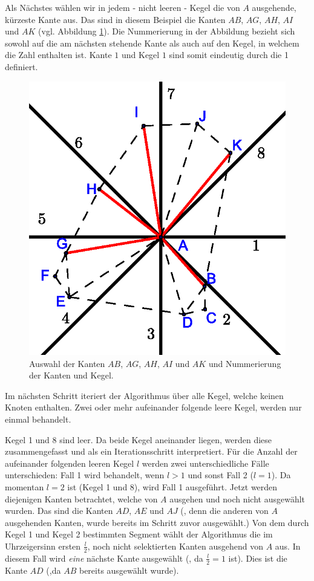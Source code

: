 \documentclass[a4paper,twoside]{IEEEtran}
\begin{document}
Als Nächstes wählen wir in jedem - nicht leeren - Kegel die von $A $ ausgehende, kürzeste Kante aus.
Das sind in diesem Beispiel die Kanten $AB $, $AG $, $AH $, $AI $ und $AK $ (vgl. Abbildung \ref{fig:shortestedge}). 
Die Nummerierung in der Abbildung bezieht sich sowohl auf die am nächsten stehende Kante als auch auf den Kegel, in welchem die Zahl enthalten ist.
Kante $1 $ und Kegel $1 $ sind somit eindeutig durch die 1 definiert.

\begin{figure}[h!]
\centering
\includegraphics[width=0.7\linewidth]{shortest_edge.eps}
\caption{Auswahl der Kanten $AB $, $AG $, $AH $, $AI $ und $AK $ und Nummerierung der Kanten und Kegel.}
\label{fig:shortestedge}
\end{figure}

Im nächsten Schritt iteriert der Algorithmus über alle Kegel, welche keinen Knoten enthalten.
Zwei oder mehr aufeinander folgende leere Kegel, werden nur einmal behandelt.

Kegel 1 und 8 sind leer.
Da beide Kegel aneinander liegen, werden diese zusammengefasst und als ein Iterationsschritt interpretiert.
Für die Anzahl der aufeinander folgenden leeren Kegel $l $ werden zwei unterschiedliche Fälle unterschieden:
Fall 1 wird behandelt, wenn $l>1 $ und sonst Fall 2 ($l=1 $).
Da momentan $l=2 $ ist (Kegel 1 und 8), wird Fall 1 ausgeführt.
Jetzt werden diejenigen Kanten betrachtet, welche von $A $ ausgehen und noch nicht ausgewählt wurden.
Das sind die Kanten $AD $, $AE$ und $AJ $ (, denn die anderen von $A $ ausgehenden Kanten, wurde bereits im Schritt zuvor ausgewählt.)
Von dem durch Kegel 1 und Kegel 2 bestimmten Segment wählt der Algorithmus die im Uhrzeigersinn ersten $\frac{l}{2} $, noch nicht selektierten Kanten ausgehend von $A $ aus.
In diesem Fall wird \emph{eine} nächste Kante ausgewählt (, da $\frac{l}{2} = 1$ ist).
Dies ist die Kante $AD $ (,da $AB $ bereits ausgewählt wurde).
\end{document}
